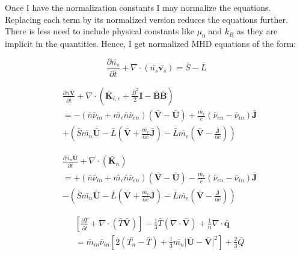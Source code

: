 \documentclass[12pt,upcase]{umlthesis}
\begin{document}
Once I have the normalization constants I may normalize the equations. Replacing each term by its normalized version reduces the equations further. There is less need to include physical constants like $\mu_0$ and $k_B$ as they are implicit in the quantities. Hence, I get normalized MHD equations of the form:

\begin{equation}\label{eq:normcontinuity}
	\frac{\partial \bar{n_s}}{\partial \bar{t}} + \nabla \cdot (\bar{n_s} \bar{\textbf{v}_s}) = \bar{S} - \bar{L}
\end{equation}

\begin{equation}\label{eq:normmomentumcom}
\begin{aligned}
	&\frac{\partial \bar{n} \bar{\textbf{V}}}{\partial \bar{t}} + \nabla \cdot (\bar{\textbf{K}}_{i,e} + \frac{\bar{B}^2}{2}\textbf{I} - \bar{\textbf{B}}\bar{\textbf{B}}) \\
	&= - (\bar{n} \bar{\nu}_{in} + \bar{m_e} \bar{n} \bar{\nu}_{en})(\bar{\textbf{V}} - \bar{\textbf{U}}) + \frac{\bar{m_e}}{\bar{e}}(\bar{\nu}_{en}-\bar{\nu}_{in}) \bar{\textbf{J}}  \\
	&+ (\bar{S} \bar{m_n} \bar{\textbf{U}} - \bar{L} (\bar{\textbf{V}}+ \frac{\bar{m_e}}{\bar{n}\bar{e}}\bar{\textbf{J}}) - \bar{L} \bar{m_e} (\bar{\textbf{V}} -\frac{\bar{\textbf{J}}}{\bar{n}\bar{e}}) )
\end{aligned} 
\end{equation}

\begin{equation}\label{eq:normmomentumneutral}
	\begin{aligned}
	&\frac{\partial \bar{n}_n \bar{\textbf{U}}}{\partial \bar{t}} + \nabla \cdot (\bar{\textbf{K}}_n) \\
	&= + (\bar{n} \bar{\nu}_{in} + \bar{m_e} \bar{n} \bar{\nu}_{en})(\bar{\textbf{V}} - \bar{\textbf{U}}) - \frac{\bar{m_e}}{\bar{e}}(\bar{\nu}_{en}-\bar{\nu}_{in}) \bar{\textbf{J}}  \\
	&- (\bar{S} \bar{m_n} \bar{\textbf{U}} - \bar{L} (\bar{\textbf{V}}+ \frac{\bar{m_e}}{\bar{n}\bar{e}}\bar{\textbf{J}}) - \bar{L} \bar{m_e} (\bar{\textbf{V}} -\frac{\bar{\textbf{J}}}{\bar{n}\bar{e}}) )
	\end{aligned}
\end{equation}

\begin{equation}\label{eq:normtemperatureion}
	\begin{aligned}
		&[\frac{\partial\bar{T}}{\partial \bar{t}} + \nabla\cdot(\bar{T} \bar{\textbf{V}})] - \frac{1}{3}\bar{T} (\nabla\cdot\bar{\textbf{V}}) + \frac{1}{\bar{n}}\nabla\cdot\bar{\textbf{q}} \\
		& = \bar{m}_{in} \bar{\nu}_{in} [2(\bar{T_n} - \bar{T}) + \frac{1}{3}\bar{m_n} \lvert \bar{\textbf{U}} - \bar{\textbf{V}} \rvert^2 ] + \frac{2}{3}\bar{Q}
	\end{aligned}
\end{equation}
\end{document}
